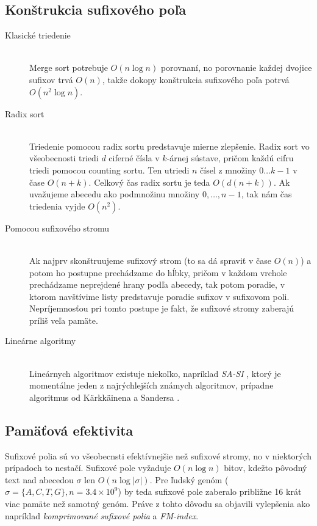     \subsection{Konštrukcia sufixového poľa}
    \begin{description}
        \item[Klasické triedenie]        \hfill \\
        Merge sort potrebuje $O(n \log{n})$ porovnaní, no porovnanie každej
        dvojice sufixov trvá $O(n)$, takže dokopy konštrukcia sufixového poľa
        potrvá $O(n^2 \log{n})$.
        \item[Radix sort]                \hfill \\
        Triedenie pomocou radix sortu predstavuje mierne zlepšenie. Radix sort
        vo všeobecnosti triedi $d$ ciferné čísla v $k$-árnej sústave, pričom
        každú cifru triedi pomocou counting sortu. Ten utriedi $n$ čísel z
        množiny ${0 \ldots k - 1}$ v čase $O(n + k)$. Celkový čas radix sortu je
        teda $O(d (n + k))$. Ak uvažujeme abecedu ako podmnožinu množiny ${0,
        \ldots, n - 1}$, tak nám čas triedenia vyjde $O(n^2)$.
        \item[Pomocou sufixového stromu] \hfill \\
        Ak najprv skonštruujeme sufixový strom (to sa dá spraviť v čase $O(n)$)
        a potom ho postupne prechádzame do hĺbky, pričom v každom vrchole
        prechádzame neprejdené hrany podľa abecedy, tak potom poradie, v ktorom
        navštívime listy predstavuje poradie sufixov v sufixovom poli.
        Nepríjemnosťou pri tomto postupe je fakt, že sufixové stromy zaberajú
        príliš veľa pamäte.
        \item[Lineárne algoritmy]        \hfill \\
        Lineárnych algoritmov existuje niekoľko, napríklad \emph{SA-SI}
        \cite{NZC09}, ktorý je momentálne jeden z najrýchlejších známych
        algoritmov, prípadne algoritmus od Kärkkäinena a Sandersa \cite{KS03}.
        
    \end{description}
    
    \subsection{Pamäťová efektivita}
    Sufixové polia sú vo všeobecnsti efektívnejšie než sufixové stromy, no v
    niektorých prípadoch to nestačí. Sufixové pole vyžaduje $O(n \log{n})$
    bitov, kdežto pôvodný text nad abecedou $\sigma$ len $O(n
    \log{\lvert \sigma \rvert})$. Pre ľudský genóm ($\sigma = \{A, C, T, G\}, n
    = 3.4 \times 10^9$) by teda sufixové pole zaberalo približne 16 krát viac
    pamäte než samotný genóm. Práve z tohto dôvodu sa objavili vylepšenia ako
    napríklad \textit{komprimované sufixové polia} a \textit{FM-index}.
    
